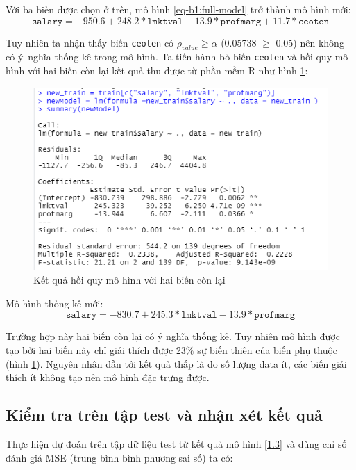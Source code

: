Với ba biến được chọn ở trên, mô hình \ref{eq-b1:full-model} trở thành mô hình mới:
\begin{equation}\label{1.2}
\texttt{salary} = -950.6 + 248.2 * \texttt{lmktval} - 13.9 *\texttt{profmarg} + 11.7  *\texttt{ceoten}
\end{equation}

Tuy nhiên ta nhận thấy biến \texttt{ceoten} có $\rho_{value} \ge \alpha$ (0.05738 $\ge$ 0.05) nên không có ý~nghĩa thống kê trong mô hình. Ta tiến hành bỏ biến \texttt{ceoten} và hồi quy mô hình với hai biến còn lại kết quả thu được từ phần mềm R như hình \ref{fig-b1:new-summary}:

\begin{figure}[H]
	\centering
	\includegraphics[width=.7\linewidth]{../Photo Of Result/B1_newsummary.PNG}  
	\caption{Kết quả hồi quy mô hình với hai biến còn lại}
	\label{fig-b1:new-summary}
\end{figure}

Mô hình thống kê mới:
\begin{equation}\label{1.3}
\texttt{salary} = -830.7 + 245.3 *\texttt{lmktval} -13.9 *\texttt{profmarg}
\end{equation}

Trường hợp này hai biến còn lại có ý nghĩa thống kê. Tuy nhiên mô hình được tạo bởi hai biến này chỉ giải thích được 23$\%$ sự biến thiên của biến phụ thuộc (hình \ref{fig-b1:new-summary}). Nguyên nhân dẫn tới kết quả thấp là do số lượng data ít, các biến giải thích ít không tạo nên mô hình đặc trưng được.

\subsection*{Kiểm tra trên tập test và nhận xét kết quả}

Thực hiện dự đoán trên tập dữ liệu test từ kết quả mô hình \ref{1.3} và dùng chỉ số đánh giá MSE (trung bình bình phương sai số) ta có:

